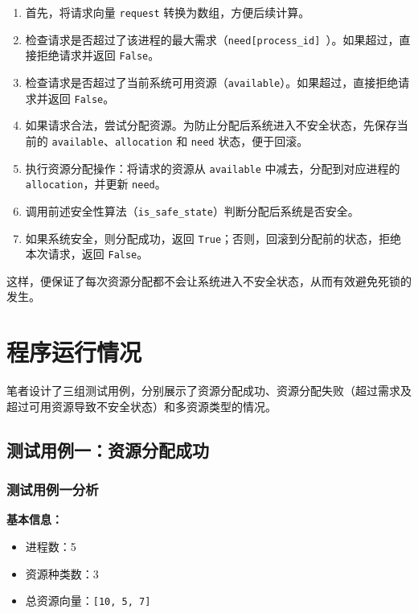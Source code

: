 \documentclass[12pt, a4paper, oneside]{ctexart}
\begin{document}
\begin{enumerate}
    \item 首先，将请求向量 \texttt{request} 转换为数组，方便后续计算。
    \item 检查请求是否超过了该进程的最大需求（\texttt{need[process\_id] }）。如果超过，直接拒绝请求并返回 \texttt{False}。
    \item 检查请求是否超过了当前系统可用资源（\texttt{available}）。如果超过，直接拒绝请求并返回 \texttt{False}。
    \item 如果请求合法，尝试分配资源。为防止分配后系统进入不安全状态，先保存当前的 \texttt{available}、\texttt{allocation} 和 \texttt{need} 状态，便于回滚。
    \item 执行资源分配操作：将请求的资源从 \texttt{available} 中减去，分配到对应进程的 \texttt{allocation}，并更新 \texttt{need}。
    \item 调用前述安全性算法（\texttt{is\_safe\_state}）判断分配后系统是否安全。
    \item 如果系统安全，则分配成功，返回 \texttt{True}；否则，回滚到分配前的状态，拒绝本次请求，返回 \texttt{False}。
\end{enumerate}

这样，便保证了每次资源分配都不会让系统进入不安全状态，从而有效避免死锁的发生。

\section{程序运行情况}

笔者设计了三组测试用例，分别展示了资源分配成功、资源分配失败（超过需求及超过可用资源导致不安全状态）和多资源类型的情况。

\subsection{测试用例一：资源分配成功}

\subsubsection{测试用例一分析}

\textbf{基本信息：}

\begin{itemize}
    \item 进程数：5
    \item 资源种类数：3
    \item 总资源向量：\texttt{[10, 5, 7]}
\end{itemize}
\end{document}
